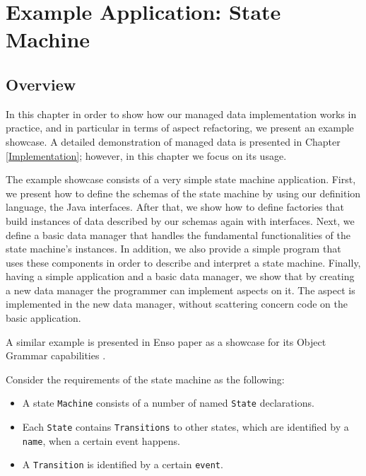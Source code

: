 
\chapter{Example Application: State Machine}\label{Example Application}

\section{Overview}
In this chapter in order to show how our managed data implementation works in practice, and in particular in terms of aspect refactoring, we present an example showcase.
A detailed demonstration of managed data is presented in Chapter \ref{Implementation}; however, in this chapter we focus on its usage.

The example showcase consists of a very simple state machine application.
First, we present how to define the schemas of the state machine by using our definition language, the Java interfaces.
After that, we show how to define factories that build instances of data described by our schemas again with interfaces.
Next, we define a basic data manager that handles the fundamental functionalities of the state machine's instances.
In addition, we also provide a simple program that uses these components in order to describe and interpret a state machine.
Finally, having a simple application and a basic data manager, we show that by creating a new data manager the programmer can implement aspects on it.
The aspect is implemented in the new data manager, without scattering concern code on the basic application.

A similar example is presented in Enso paper as a showcase for its Object Grammar capabilities \cite{storm2012object}.

Consider the requirements of the state machine as the following: 
\begin{itemize}
	\item A state \texttt{Machine} consists of a number of named \texttt{State} declarations.

	\item Each \texttt{State} contains \texttt{Transitions} to other states, which are identified by a \texttt{name}, when a certain event happens.

	\item A \texttt{Transition} is identified by a certain \texttt{event}.
\end{itemize}

